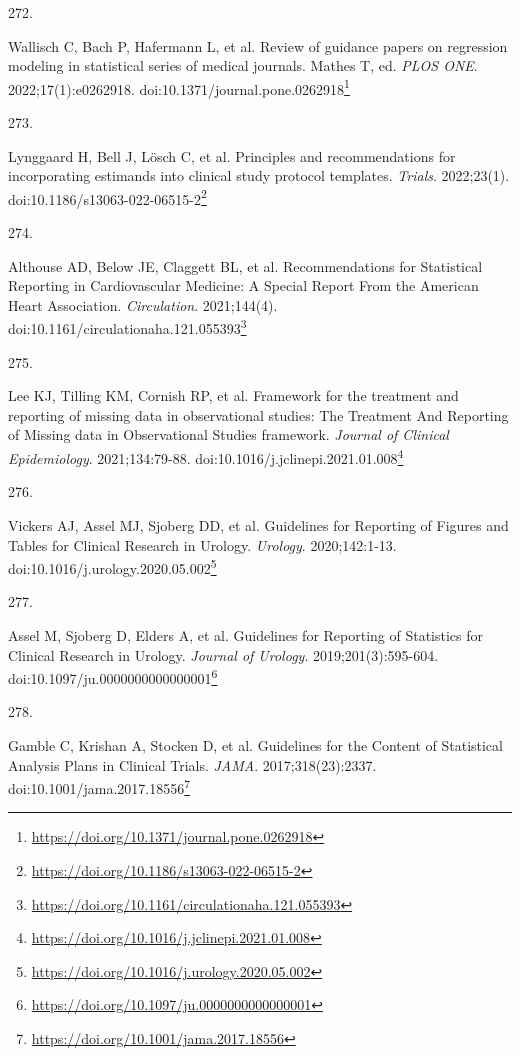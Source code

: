 \documentclass[
  a4paper,
]{book}
\newlength{\cslhangindent}
\newlength{\csllabelwidth}
\newlength{\cslentryspacingunit} %
\newenvironment{CSLReferences}[2] %
 {%
  \setlength{\parindent}{0pt}
  \ifodd #1
  \let\oldpar\par
  \def\par{\hangindent=\cslhangindent\oldpar}
  \fi
  \setlength{\parskip}{#2\cslentryspacingunit}
 }%
 {}
\newcommand{\CSLLeftMargin}[1]{\parbox[t]{\csllabelwidth}{#1}}
\newcommand{\CSLRightInline}[1]{\parbox[t]{\linewidth - \csllabelwidth}{#1}\break}
\renewcommand{\href}[2]{#2\footnote{\url{#1}}}
\begin{document}
\begin{CSLReferences}{0}{0}
\leavevmode{}%
\CSLLeftMargin{272. }%
\CSLRightInline{Wallisch C, Bach P, Hafermann L, et al. Review of guidance papers on regression modeling in statistical series of medical journals. Mathes T, ed. \emph{PLOS ONE}. 2022;17(1):e0262918. doi:\href{https://doi.org/10.1371/journal.pone.0262918}{10.1371/journal.pone.0262918}}

\leavevmode{}%
\CSLLeftMargin{273. }%
\CSLRightInline{Lynggaard H, Bell J, Lösch C, et al. Principles and recommendations for incorporating estimands into clinical study protocol templates. \emph{Trials}. 2022;23(1). doi:\href{https://doi.org/10.1186/s13063-022-06515-2}{10.1186/s13063-022-06515-2}}

\leavevmode{}%
\CSLLeftMargin{274. }%
\CSLRightInline{Althouse AD, Below JE, Claggett BL, et al. Recommendations for Statistical Reporting in Cardiovascular Medicine: A Special Report From the American Heart Association. \emph{Circulation}. 2021;144(4). doi:\href{https://doi.org/10.1161/circulationaha.121.055393}{10.1161/circulationaha.121.055393}}

\leavevmode{}%
\CSLLeftMargin{275. }%
\CSLRightInline{Lee KJ, Tilling KM, Cornish RP, et al. Framework for the treatment and reporting of missing data in observational studies: The Treatment And Reporting of Missing data in Observational Studies framework. \emph{Journal of Clinical Epidemiology}. 2021;134:79-88. doi:\href{https://doi.org/10.1016/j.jclinepi.2021.01.008}{10.1016/j.jclinepi.2021.01.008}}

\leavevmode{}%
\CSLLeftMargin{276. }%
\CSLRightInline{Vickers AJ, Assel MJ, Sjoberg DD, et al. Guidelines for Reporting of Figures and Tables for Clinical Research in Urology. \emph{Urology}. 2020;142:1-13. doi:\href{https://doi.org/10.1016/j.urology.2020.05.002}{10.1016/j.urology.2020.05.002}}

\leavevmode{}%
\CSLLeftMargin{277. }%
\CSLRightInline{Assel M, Sjoberg D, Elders A, et al. Guidelines for Reporting of Statistics for Clinical Research in Urology. \emph{Journal of Urology}. 2019;201(3):595-604. doi:\href{https://doi.org/10.1097/ju.0000000000000001}{10.1097/ju.0000000000000001}}

\leavevmode{}%
\CSLLeftMargin{278. }%
\CSLRightInline{Gamble C, Krishan A, Stocken D, et al. Guidelines for the Content of Statistical Analysis Plans in Clinical Trials. \emph{JAMA}. 2017;318(23):2337. doi:\href{https://doi.org/10.1001/jama.2017.18556}{10.1001/jama.2017.18556}}


\end{CSLReferences}
\end{document}
